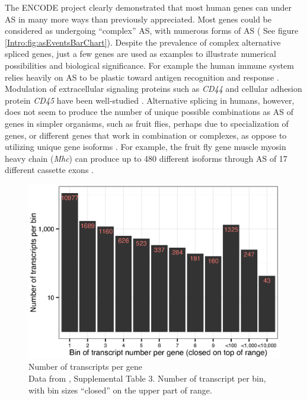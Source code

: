    The ENCODE project clearly demonstrated that most human genes can under AS in many more ways than previously appreciated. Most genes could be considered as undergoing ``complex'' AS, with numerous forms of AS ( See figure \ref{Intro:fig:asEventsBarChart}). Despite the prevalence of complex alternative spliced genes, just a few genes are used as examples to illustrate numerical possibilities and biological significance. For example the human immune system relies heavily on AS to be plastic toward antigen recognition and response \citep{Lynch2004}. Modulation of extracellular signaling proteins such as \textit{CD44} and cellular adhesion protein \textit{CD45} have been well-studied \citep{Zikherman2008,Ponta2003}. Alternative splicing in humans, however, does not seem to produce the number of unique possible combinations as AS of genes in simpler organisms, such as fruit flies, perhaps due to specialization of genes, or different genes that work in combination or complexes, as oppose to utilizing unique gene isoforms \citep{Park2007}. For example, the fruit fly gene muscle myosin heavy chain (\textit{Mhc}) can produce up to 480 different isoforms through AS of 17 different cassette exons \citep{Bernstein1983a}.  

      \begin{figure} %
        \centering 
        \includegraphics{Figures/Intro/NumberOFTranscriptsPerFlyGene.eps}
        \caption[Number of transcripts per \flies{} gene]
        {
          Number of transcripts per \flies{} gene\\[0.25cm]
          Data from \citep{Brown2014}, Supplemental Table 3. Number of transcript per bin, with bin sizes ``closed'' on the upper part of range.
          }
        \label{Intro:fig:txPerFlyGene}
        \end{figure}


